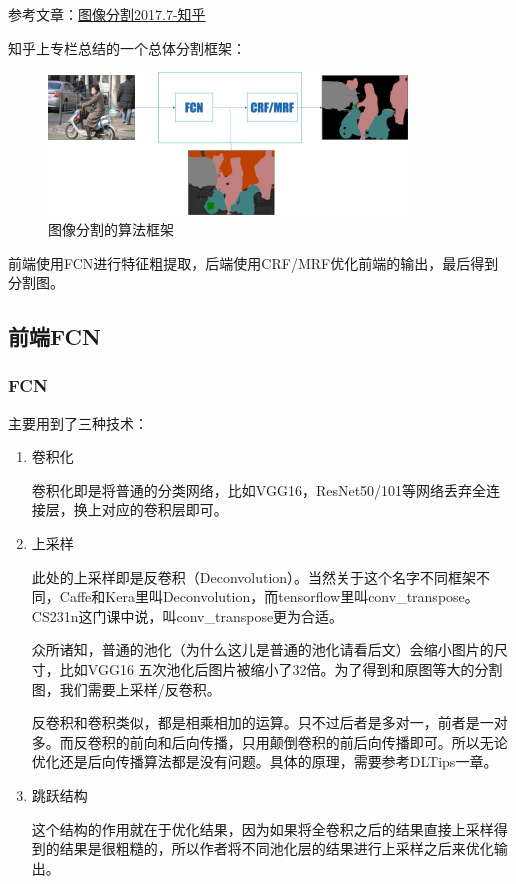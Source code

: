 参考文章：\href{https://zhuanlan.zhihu.com/p/22308032}{图像分割2017.7-知乎}

知乎上专栏总结的一个总体分割框架：
\begin{figure}[!hbtp]
\centering
\includegraphics[width=0.85\textwidth]{SemanticSLAM/ImageSegmentFrame0.jpg}
\caption{图像分割的算法框架}
\label{ImageSegmentFrame0}
\end{figure}

前端使用FCN进行特征粗提取，后端使用CRF/MRF优化前端的输出，最后得到分割图。 

\subsection{前端FCN}

\subsubsection{FCN}

主要用到了三种技术：
\begin{enumerate}
\item 卷积化

卷积化即是将普通的分类网络，比如VGG16，ResNet50/101等网络丢弃全连接层，换上对应的卷积层即可。

\item 上采样

此处的上采样即是反卷积（Deconvolution）。当然关于这个名字不同框架不同，Caffe和Kera里叫Deconvolution，而tensorflow里叫conv\_transpose。CS231n这门课中说，叫conv\_transpose更为合适。

众所诸知，普通的池化（为什么这儿是普通的池化请看后文）会缩小图片的尺寸，比如VGG16 五次池化后图片被缩小了32倍。为了得到和原图等大的分割图，我们需要上采样/反卷积。

反卷积和卷积类似，都是相乘相加的运算。只不过后者是多对一，前者是一对多。而反卷积的前向和后向传播，只用颠倒卷积的前后向传播即可。所以无论优化还是后向传播算法都是没有问题。具体的原理，需要参考DLTips一章。

\item 跳跃结构

这个结构的作用就在于优化结果，因为如果将全卷积之后的结果直接上采样得到的结果是很粗糙的，所以作者将不同池化层的结果进行上采样之后来优化输出。

\end{enumerate}

